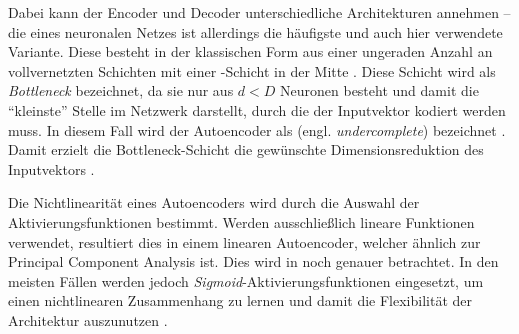 Dabei kann der Encoder und Decoder unterschiedliche Architekturen annehmen -- die eines neuronalen
Netzes ist allerdings die häufigste und auch hier verwendete Variante. Diese besteht in der
klassischen Form aus einer ungeraden Anzahl an vollvernetzten Schichten mit einer
-Schicht in der Mitte \parencite[2]{Bank.2020}. Diese Schicht wird als \textit{Bottleneck} bezeichnet, da sie nur aus $d < D$
Neuronen besteht und damit die \enquote{kleinste} Stelle im Netzwerk darstellt, durch die der
Inputvektor kodiert werden muss. In diesem Fall wird der Autoencoder als 
(engl. \textit{undercomplete}) bezeichnet \parencite[503]{Goodfellow.2016}.
Damit erzielt die Bottleneck-Schicht die gewünschte Dimensionsreduktion des Inputvektors \parencites[502]{Goodfellow.2016}[2]{Bank.2020}.

Die Nichtlinearität eines Autoencoders wird durch die Auswahl der Aktivierungsfunktionen bestimmt.
Werden ausschließlich lineare Funktionen verwendet, resultiert dies in einem linearen Autoencoder,
welcher ähnlich zur Principal Component Analysis ist. Dies wird in
 noch genauer betrachtet. In den meisten Fällen werden
jedoch \textit{Sigmoid}-Aktivierungsfunktionen eingesetzt, um einen nichtlinearen Zusammenhang zu
lernen und damit die Flexibilität der Architektur auszunutzen \parencite[4]{Charte.2018}.

